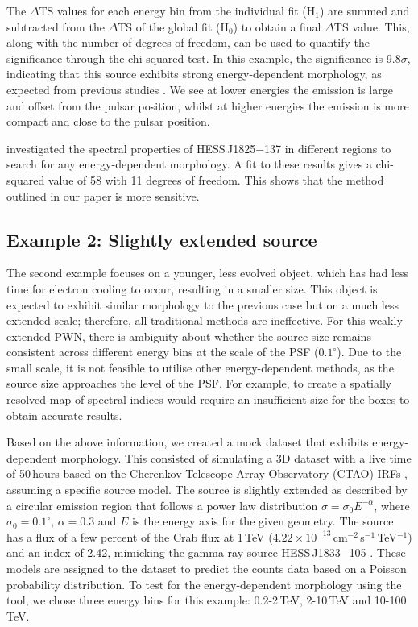 \documentclass{aa}
\newcommand{\hessj}{HESS\,J1825$-$137\xspace}
\begin{document}
The $\Delta$TS values for each energy bin from the individual fit (H$_1$) are summed and subtracted from the $\Delta$TS of the global fit (H$_0$) to obtain a final $\Delta$TS value. This, along with the number of degrees of freedom, can be used to quantify the significance through the chi-squared test. In this example, the significance is 9.8$\sigma$, indicating that this source exhibits strong energy-dependent morphology, as expected from previous studies \citep{Aharonian_2006,Edep_Principe_2020,Edep_PWNe_HESS_2019}. We see at lower energies the emission is large and offset from the pulsar position, whilst at higher energies the emission is more compact and close to the pulsar position. 

\cite{Aharonian_2006} investigated the spectral properties of \hessj in different regions to search for any energy-dependent morphology. A fit to these results gives a chi-squared value of 58 with 11 degrees of freedom. This shows that the method outlined in our paper is more sensitive.


\subsection{Example 2: Slightly extended source}
\label{subsec:example2}
The second example focuses on a younger, less evolved object, which has had less time for electron cooling to occur, resulting in a smaller size. This object is expected to exhibit similar morphology to the previous case but on a much less extended scale; therefore, all traditional methods are ineffective. 
For this weakly extended PWN, there is ambiguity about whether the source size remains consistent across different energy bins at the scale of the PSF ($0.1^{\circ}$). 
Due to the small scale, it is not feasible to utilise other energy-dependent methods, as the source size approaches the level of the PSF. For example, to create a spatially resolved map of spectral indices would require an insufficient size for the boxes to obtain accurate results.

Based on the above information, we created a mock dataset that exhibits energy-dependent morphology. This consisted of simulating a 3D dataset with a live time of 50\,hours based on the Cherenkov Telescope Array Observatory (CTAO) IRFs \citep{CTAO_IRFs}, assuming a specific source model. 
The source is slightly extended as described by a circular emission region that follows a power law distribution $\sigma=\sigma_0 E^{-\alpha}$, where $\sigma_0=0.1^{\circ}$, $\alpha=0.3$ and $E$ is the energy axis for the given geometry.
The source has a flux of a few percent of the Crab flux at 1\,TeV ($4.22\times 10^{-13}$\,cm$^{-2}$\,s$^{-1}$\,TeV$^{-1}$) and an index of 2.42, mimicking the gamma-ray source HESS\,J1833$-$105 \citep[a composite SNR and PWN system,][]{hgps_2018,J1833_2008}. These models are assigned to the dataset to predict the counts data based on a Poisson probability distribution. 
To test for the energy-dependent morphology using the tool, we chose three energy bins for this example: 0.2-2\,TeV, 2-10\,TeV and 10-100\,TeV. 
\end{document}
